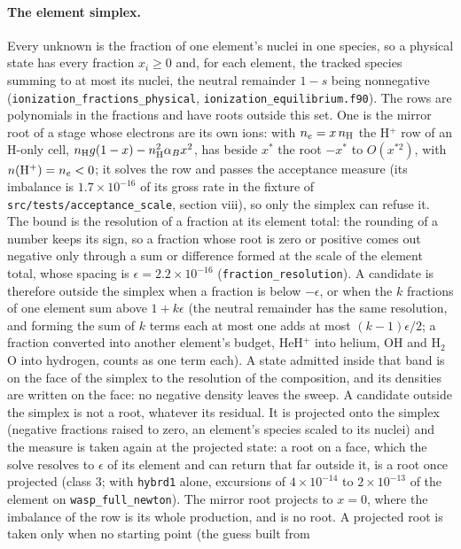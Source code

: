 \paragraph{The element simplex.} Every unknown is the fraction of one
element's nuclei in one species, so a physical state has every fraction
$x_i\ge0$ and, for each element, the tracked species summing to at most its
nuclei, the neutral remainder $1-s$ being nonnegative
(\texttt{ionization\_fractions\_physical}, \texttt{ionization\_equilibrium.f90}).
The rows are polynomials in the fractions and have roots outside this set. One
is the mirror root of a stage whose electrons are its own ions: with
$n_e=x\,n_{\rm H}$ the H$^+$ row of an H-only cell,
$n_{\rm H}g(1-x)-n_{\rm H}^2\alpha_B x^2$, has beside $x^\ast$ the root
$-x^\ast$ to $O(x^{\ast2})$, with $n({\rm H^+})=n_e<0$; it solves the row
and passes the acceptance measure (its imbalance is $1.7\times10^{-16}$ of its
gross rate in the fixture of \texttt{src/tests/acceptance\_scale}, section
viii), so only the simplex can refuse it. The bound is the resolution of a
fraction at its element total: the rounding of a number keeps its sign, so a
fraction whose root is zero or positive comes out negative only through a sum
or difference formed at the scale of the element total, whose spacing is
$\epsilon=2.2\times10^{-16}$ (\texttt{fraction\_resolution}). A candidate
is therefore outside the simplex when a fraction is below $-\epsilon$, or
when the $k$ fractions of one element sum above $1+k\epsilon$ (the neutral
remainder has the same resolution, and forming the sum of $k$ terms each at
most one adds at most $(k-1)\epsilon/2$; a fraction converted into another
element's budget, HeH$^+$ into helium, OH and H$_2$O into hydrogen, counts as
one term each). A state admitted inside that band is on the face of the
simplex to the resolution of the composition, and its densities are written
on the face: no negative density leaves the sweep. A candidate outside the
simplex is not a root, whatever its residual. It is projected onto the
simplex (negative fractions raised to zero, an element's species scaled to
its nuclei) and the measure is taken again at the projected state: a root on
a face, which the solve resolves to $\epsilon$ of its element and can return
that far outside it, is a root once projected (class 3; with \texttt{hybrd1}
alone, excursions of $4\times10^{-14}$ to $2\times10^{-13}$ of the element on
\texttt{wasp\_full\_newton}). The mirror root projects to $x=0$, where
the imbalance of the row is its whole production, and is no root. A
projected root is taken only when no starting point (the guess built from
